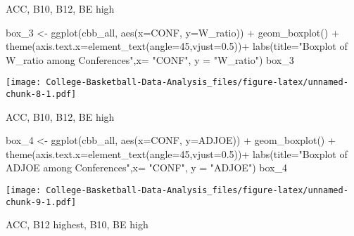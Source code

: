 \documentclass[
]{article}
\newenvironment{Shaded}{\begin{snugshade}}{\end{snugshade}}
\newcommand{\AttributeTok}[1]{\textcolor[rgb]{0.77,0.63,0.00}{#1}}
\newcommand{\DecValTok}[1]{\textcolor[rgb]{0.00,0.00,0.81}{#1}}
\newcommand{\FloatTok}[1]{\textcolor[rgb]{0.00,0.00,0.81}{#1}}
\newcommand{\FunctionTok}[1]{\textcolor[rgb]{0.00,0.00,0.00}{#1}}
\newcommand{\NormalTok}[1]{#1}
\newcommand{\OtherTok}[1]{\textcolor[rgb]{0.56,0.35,0.01}{#1}}
\newcommand{\SpecialCharTok}[1]{\textcolor[rgb]{0.00,0.00,0.00}{#1}}
\newcommand{\StringTok}[1]{\textcolor[rgb]{0.31,0.60,0.02}{#1}}
\begin{document}
ACC, B10, B12, BE high

\begin{Shaded}
\begin{Highlighting}[]
\NormalTok{box\_3 }\OtherTok{\textless{}{-}} \FunctionTok{ggplot}\NormalTok{(cbb\_all, }\FunctionTok{aes}\NormalTok{(}\AttributeTok{x=}\NormalTok{CONF, }\AttributeTok{y=}\NormalTok{W\_ratio)) }\SpecialCharTok{+} \FunctionTok{geom\_boxplot}\NormalTok{() }\SpecialCharTok{+} \FunctionTok{theme}\NormalTok{(}\AttributeTok{axis.text.x=}\FunctionTok{element\_text}\NormalTok{(}\AttributeTok{angle=}\DecValTok{45}\NormalTok{,}\AttributeTok{vjust=}\FloatTok{0.5}\NormalTok{))}\SpecialCharTok{+} \FunctionTok{labs}\NormalTok{(}\AttributeTok{title=}\StringTok{"Boxplot of W\_ratio among Conferences"}\NormalTok{,}\AttributeTok{x=} \StringTok{"CONF"}\NormalTok{, }\AttributeTok{y =} \StringTok{"W\_ratio"}\NormalTok{)}
\NormalTok{box\_3}
\end{Highlighting}
\end{Shaded}

\texttt{[image: College-Basketball-Data-Analysis\_files/figure-latex/unnamed-chunk-8-1.pdf]}

ACC, B10, B12, BE high

\begin{Shaded}
\begin{Highlighting}[]
\NormalTok{box\_4 }\OtherTok{\textless{}{-}} \FunctionTok{ggplot}\NormalTok{(cbb\_all, }\FunctionTok{aes}\NormalTok{(}\AttributeTok{x=}\NormalTok{CONF, }\AttributeTok{y=}\NormalTok{ADJOE)) }\SpecialCharTok{+} \FunctionTok{geom\_boxplot}\NormalTok{() }\SpecialCharTok{+} \FunctionTok{theme}\NormalTok{(}\AttributeTok{axis.text.x=}\FunctionTok{element\_text}\NormalTok{(}\AttributeTok{angle=}\DecValTok{45}\NormalTok{,}\AttributeTok{vjust=}\FloatTok{0.5}\NormalTok{))}\SpecialCharTok{+} \FunctionTok{labs}\NormalTok{(}\AttributeTok{title=}\StringTok{"Boxplot of ADJOE among Conferences"}\NormalTok{,}\AttributeTok{x=} \StringTok{"CONF"}\NormalTok{, }\AttributeTok{y =} \StringTok{"ADJOE"}\NormalTok{)}
\NormalTok{box\_4}
\end{Highlighting}
\end{Shaded}

\texttt{[image: College-Basketball-Data-Analysis\_files/figure-latex/unnamed-chunk-9-1.pdf]}

ACC, B12 highest, B10, BE high
\end{document}
